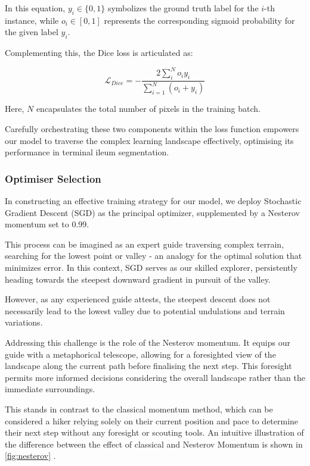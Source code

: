 In this equation, \(y_{i} \in \{ 0, 1 \}\) symbolizes the ground truth label for the \(i\)-th instance, while \(o_{i} \in \left[0, 1\right]\) represents the corresponding sigmoid probability for the given label \(y_{i}\).

Complementing this, the Dice loss is articulated as:

\[
\mathcal{L}_{Dice} = -\frac{2\sum_{i}^{N}o_{i}y_{i}}{\sum_{i=1}^{N}\left(o_{i} + y_{i}\right)}
\]

Here, \(N\) encapsulates the total number of pixels in the training batch.

Carefully orchestrating these two components within the loss function empowers our model to traverse the complex learning landscape effectively, optimising its performance in terminal ileum segmentation.

\subsubsection*{Optimiser Selection}

In constructing an effective training strategy for our model, we deploy Stochastic Gradient Descent (SGD) as the principal optimizer, supplemented by a Nesterov momentum set to 0.99.

This process can be imagined as an expert guide traversing complex terrain, searching for the lowest point or valley - an analogy for the optimal solution that minimizes error. In this context, SGD serves as our skilled explorer, persistently heading towards the steepest downward gradient in pursuit of the valley.

However, as any experienced guide attests, the steepest descent does not necessarily lead to the lowest valley due to potential undulations and terrain variations.

Addressing this challenge is the role of the Nesterov momentum. It equips our guide with a metaphorical telescope, allowing for a foresighted view of the landscape along the current path before finalising the next step. This foresight permits more informed decisions considering the overall landscape rather than the immediate surroundings.

This stands in contrast to the classical momentum method, which can be considered a hiker relying solely on their current position and pace to determine their next step without any foresight or scouting tools. An intuitive illustration of the difference between the effect of classical and Nesterov Momentum is shown in \autoref{fig:nesterov} \cite{lectures16:online}.

